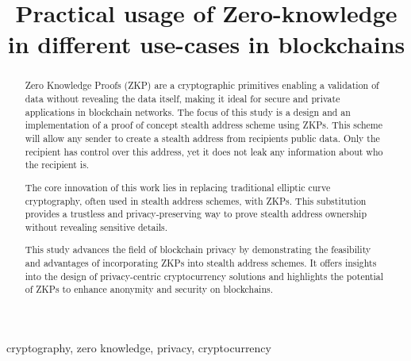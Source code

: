 \documentclass[conference,comsoc,10pt]{IEEEtran}
\begin{document}
\hypersetup{
    colorlinks=true,
    linkcolor=blue,
    urlcolor=cyan,
}

\newcommand{\DOUBLEBLIND}{}   

\title{Practical usage of Zero-knowledge in different use-cases in blockchains} 

\author{
}

\maketitle

\begin{abstract}
    Zero Knowledge Proofs (ZKP) are a cryptographic primitives enabling a
    validation of data without revealing the data itself, making it ideal for
    secure and private applications in blockchain networks. The focus of this
    study is a design and an implementation of a proof of concept stealth
    address scheme using ZKPs. This scheme will allow any sender to create a
    stealth address from recipients public data. Only the recipient has control
    over this address, yet it does not leak any information about who the
    recipient is.

    The core innovation of this work lies in replacing traditional elliptic
    curve cryptography, often used in stealth address schemes, with ZKPs. This
    substitution provides a trustless and privacy-preserving way to prove
    stealth address ownership without revealing sensitive details.

    This study advances the field of blockchain privacy by demonstrating the
    feasibility and advantages of incorporating ZKPs into stealth address
    schemes. It offers insights into the design of privacy-centric
    cryptocurrency solutions and highlights the potential of ZKPs to enhance
    anonymity and security on blockchains.

\end{abstract}

\begin{IEEEkeywords}
    cryptography, zero knowledge, privacy, cryptocurrency
\end{IEEEkeywords}
\end{document}
